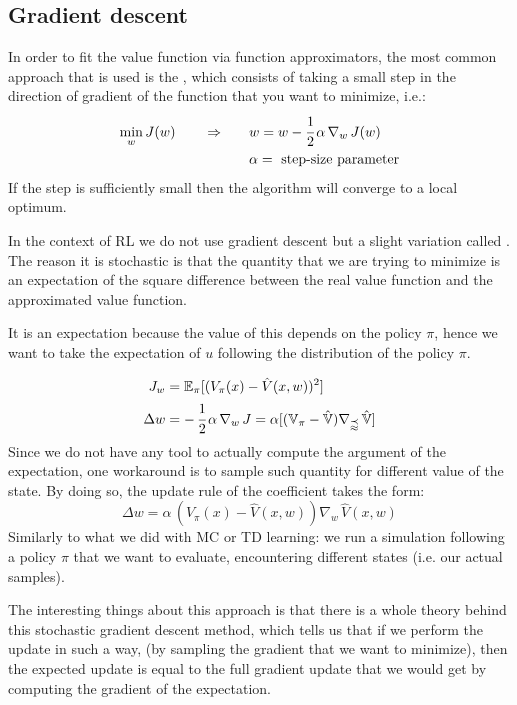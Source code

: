 \subsection{Gradient descent}
In order to fit the value function via function approximators, the most common approach that is used is the , which consists of taking a small step in the direction of gradient of the function that you want to minimize, i.e.:
\begin{align*}
\min_w J(w) \qquad \Rightarrow \qquad& w = w-\cfrac{1}{2}\,\alpha\,\nabla_w\,J(w)\\
& \alpha = \text{ step-size parameter}
\end{align*}
If the step is sufficiently small then the algorithm will converge to a local optimum.

In the context of RL we do not use gradient descent but a slight variation called . The reason it is stochastic is that the quantity that we are trying to minimize is an expectation of the square difference between the real value function and the approximated value function. 

It is an expectation because the value of this depends on the policy $\pi$, hence we want to take the expectation of $u$ following the distribution of the policy $\pi$.

\begin{align*}
J_w &= \mathbb{E}_{\pi} [(V_{\pi}(x) - \hat{V}(x,w))^2]\\
\Delta w &= -\,\cfrac{1}{2}\,\alpha\,\nabla_w\,J = \alpha \mathbb{[(V_\pi - \hat{V})\nabla_w\,\hat{V}]}
\end{align*}
Since we do not have any tool to actually compute the argument of the expectation, one workaround is to sample such quantity for different value of the state. By doing so, the update rule of the coefficient takes the form:
\[\Delta w = \alpha\,(V_{\pi}(x) - \hat{V}(x, w))\nabla_w\,\hat{V}(x,w)\]
Similarly to what we did with MC or TD learning: we run a simulation following a policy $\pi$ that we want to evaluate, encountering different states (i.e. our actual samples).

The interesting things about this approach is that there is a whole theory behind this stochastic gradient descent method, which tells us that if we perform the update in such a way, (by sampling the gradient that we want to minimize), then the expected update is equal to the full gradient update that we would get by computing the gradient of the expectation.

